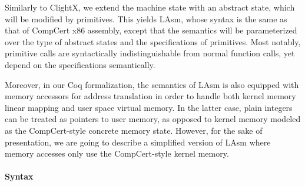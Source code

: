 Similarly to ClightX, we extend the machine state with an abstract
state, which will be modified by primitives. This yields LAsm, whose
syntax is the same as that of CompCert x86 assembly, except that the
semantics will be parameterized over the type of abstract states and
the specifications of primitives.  Most notably, primitive calls are
syntactically indistinguishable from normal function calls, yet depend
on the specifications semantically.

Moreover, in our Coq formalization, the semantics of LAsm is also
equipped with memory accessors for address translation in order to handle both
kernel memory linear mapping and user space virtual memory.
In the latter case, plain integers can be treated
as pointers to user memory, as opposed to kernel memory modeled as the
CompCert-style concrete memory state. However, for the sake of
presentation, we are going to describe a simplified version of LAsm
where memory accesses only use the CompCert-style kernel memory.


  \paragraph{Syntax}

